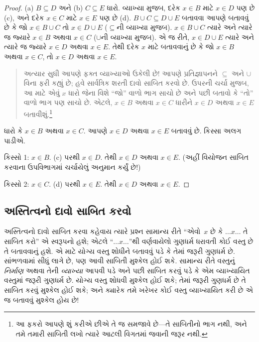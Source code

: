 \begin{proof}
  (a) $B \subseteq D$ અને (b) $C \subseteq E$ ધારો. વ્યાખ્યા
  મુજબ, દરેક $x \in B$ માટે $x \in D$ પણ છે (c), અને દરેક
  $x \in C$ માટે $x \in E$ પણ છે (d). $B \cup C \subseteq D \cup E$ બતાવવા
  આપણે બતાવવું છે કે જો $x \in B \cup C$ તો $x \in D \cup E$
  ($\subseteq$ની વ્યાખ્યા મુજબ). $x \in B \cup C$ ત્યારે
  અને ત્યારે જ જ્યારે $x \in B$ અથવા $x \in
  C$ ($\cup$ની વ્યાખ્યા મુજબ). એ જ રીતે, $x \in D \cup E$
  ત્યારે અને ત્યારે જ જ્યારે $x \in D$ અથવા $x \in E$.
  તેથી દરેક $x$ માટે બતાવવાનું છે કે જો $x \in B$ અથવા
  $x \in C$, તો $x \in D$ અથવા $x \in E$.

  \begin{quote}
  અત્યાર સુધી આપણે ફક્ત વ્યાખ્યાઓ ઉકેલી છે!{} આપણે
  પ્રતિજ્ઞાપનને $\subseteq$ અને $\cup$ વિના ફરી કહ્યું છે;
  હવે સાર્વત્રિક શરતી દાવો સાબિત કરવો છે. ઉપરની ચર્ચા મુજબ,
  આ માટે એવું $x$ ધારો જેના વિશે ``જો'' વાળો ભાગ સાચો છે
  અને પછી બતાવો કે ``તો'' વાળો ભાગ પણ સાચો છે. એટલે,
  $x
  \in B$ અથવા $x \in C$ ધારીને $x \in D$ અથવા $x \in
  E$ બતાવીશું.\footnote{આ ફકરો આપણે શું કરીએ છીએ તે જ સમજાવે
    છે---તે સાબિતીનો ભાગ નથી, અને તમે તમારી સાબિતી લખો ત્યારે
    આટલી વિગતમાં જવાની જરૂર નથી.}
  \end{quote}

  ધારો કે $x \in B$ અથવા $x \in C$. આપણે $x \in D$
  અથવા $x \in E$ બતાવવું છે. કિસ્સા અલગ પાડીએ.

  કિસ્સો 1: $x \in B$. (c) પરથી $x \in D$. તેથી $x \in D$ અથવા
  $x \in
  E$. (અહીં વિયોજન સાબિત કરવાના ઉપવિભાગમાં ચર્ચાયેલું અનુમાન કર્યું છે!)

  કિસ્સો 2: $x \in C$. (d) પરથી $x \in E$. તેથી $x \in D$ અથવા $x \in E$.
 \end{proof}

\subsection{અસ્તિત્વનો દાવો સાબિત કરવો}

અસ્તિત્વનો દાવો સાબિત કરવા કહેવાય ત્યારે પ્રશ્ન સામાન્ય રીતે
``એવો~$x$ છે કે $\dots x \dots$ તે સાબિત કરો'' એ સ્વરૂપનો
હશે; એટલે ``$\dots x
\dots$''થી વર્ણવાયેલો ગુણધર્મ ધરાવતી કોઈ વસ્તુ છે તે બતાવવાનું
હશે. એ માટે યોગ્ય વસ્તુ શોધીને બતાવવું પડે કે તેમાં જરૂરી
ગુણધર્મ છે. સાંભળવામાં સીધું લાગે છે, પણ આવી સાબિતી મુશ્કેલ
હોઈ શકે. સામાન્ય રીતે વસ્તુનું \emph{નિર્માણ} અથવા તેની
\emph{વ્યાખ્યા} આપવી પડે અને પછી સાબિત કરવું પડે કે એમ
વ્યાખ્યાયિત વસ્તુમાં જરૂરી ગુણધર્મ છે. યોગ્ય વસ્તુ શોધવી
મુશ્કેલ હોઈ શકે; તેમાં જરૂરી ગુણધર્મ છે તે સાબિત કરવું મુશ્કેલ
હોઈ શકે; અને ક્યારેક તમે ખરેખર કોઈ વસ્તુ વ્યાખ્યાયિત કરી છે
એ જ બતાવવું મુશ્કેલ હોય છે!{}

